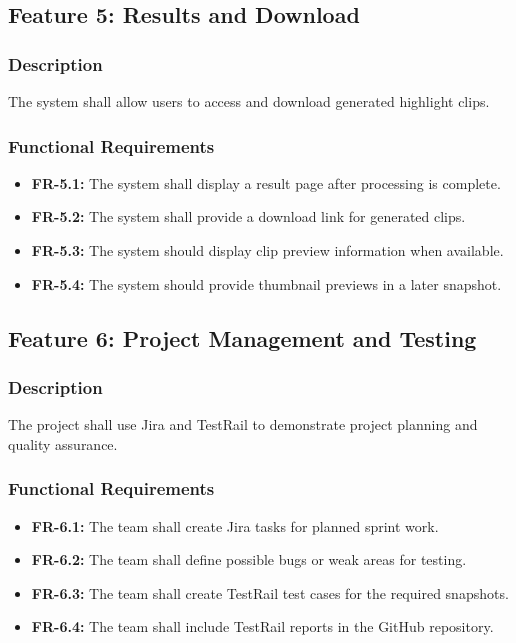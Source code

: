 \documentclass[12pt]{article}
\begin{document}
\subsection{Feature 5: Results and Download}

\subsubsection{Description}
The system shall allow users to access and download generated highlight clips.

\subsubsection{Functional Requirements}
\begin{itemize}[noitemsep]
    \item \textbf{FR-5.1:} The system shall display a result page after processing is complete.
    \item \textbf{FR-5.2:} The system shall provide a download link for generated clips.
    \item \textbf{FR-5.3:} The system should display clip preview information when available.
    \item \textbf{FR-5.4:} The system should provide thumbnail previews in a later snapshot.
\end{itemize}

\subsection{Feature 6: Project Management and Testing}

\subsubsection{Description}
The project shall use Jira and TestRail to demonstrate project planning and quality assurance.

\subsubsection{Functional Requirements}
\begin{itemize}[noitemsep]
    \item \textbf{FR-6.1:} The team shall create Jira tasks for planned sprint work.
    \item \textbf{FR-6.2:} The team shall define possible bugs or weak areas for testing.
    \item \textbf{FR-6.3:} The team shall create TestRail test cases for the required snapshots.
    \item \textbf{FR-6.4:} The team shall include TestRail reports in the GitHub repository.
\end{itemize}
\end{document}
